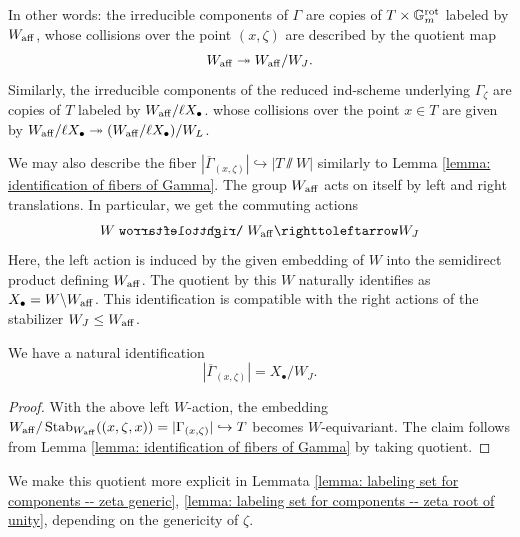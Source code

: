 \begin{remark}\label{remark: colisions of components of Gamma}
In other words: the irreducible components of $\Gamma$ are copies of $T \times \mathbb{G}_m^{\mathrm{rot}}$ labeled by $W_{\mathrm{aff}}$, whose collisions over the point $(x, \zeta)$ are described by the quotient map
\begin{equation*}
    W_{\mathrm{aff}} \twoheadrightarrow W_{\mathrm{aff}} / W_{J}.
\end{equation*}
Similarly, the irreducible components of the reduced ind-scheme underlying $\Gamma_{\zeta}$ are copies of $T$ labeled by $W_{\mathrm{aff}}/ \ell X_{\bullet}$. whose collisions over the point $x \in T$ are given by
$W_{\mathrm{aff}}/ \ell X_{\bullet} \twoheadrightarrow  (W_{\mathrm{aff}}/ \ell X_{\bullet})/ W_{L}$.
\end{remark}




We may also describe the fiber $|\overline{\Gamma}_{(x, \zeta)}| \hookrightarrow |T\sslash W|$ similarly to Lemma \ref{lemma: identification of fibers of Gamma}. The group $W_{\mathrm{aff}}$ acts on itself by left and right translations. In particular, we get the commuting actions
\begin{equation*}
    W \acts W_{\aff} \actsr W_J
\end{equation*}
Here, the left action is induced by the given embedding of $W$ into the semidirect product defining $W_{\mathrm{aff}}$. The quotient by this $W$ naturally identifies as $X_{\bullet} = W\backslash W_{\mathrm{aff}}$. This identification is compatible with the right actions of the stabilizer $W_J \leq W_{\mathrm{aff}}$.

\begin{lemma}\label{lemma: fiber of cocharacter graphs as lattice quotient}
We have a natural identification    
\begin{equation*}
 |\overline{\Gamma}_{(x, \zeta)}| = X_{\bullet} /  W_J.
\end{equation*}
\end{lemma}
\begin{proof}
With the above left $W$-action, the embedding
$W_{\mathrm{aff}} / \operatorname{Stab}_{W_{\mathrm{aff}}}((x, \zeta, x)) = |\Gamma_{(x, \zeta)}| \hookrightarrow T$
becomes $W$-equivariant. The claim follows from Lemma \ref{lemma: identification of fibers of Gamma} by taking quotient.    
\end{proof}

We make this quotient more explicit in Lemmata \ref{lemma: labeling set for components -- zeta generic}, \ref{lemma: labeling set for components -- zeta root of unity}, depending on the genericity of $\zeta$.




